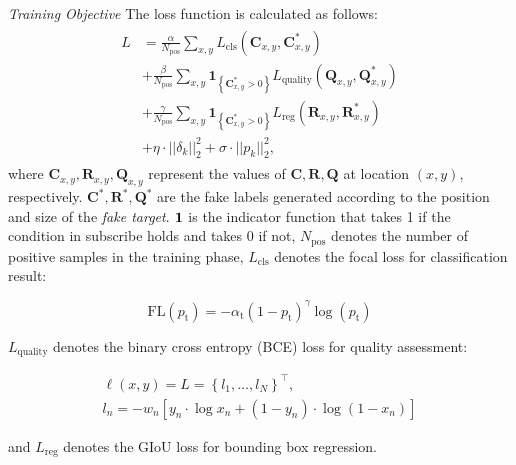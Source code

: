 \documentclass[journal]{IEEEtran}
\begin{document}
\textit{Training Objective} The loss function is calculated as follows:
\begin{equation}
\begin{array}{l}
\begin{aligned}
L&=\frac{\alpha}{N_{\mathrm{pos}}} \sum_{x, y} L_{\mathrm{cls}}\left(\textbf{C}_{x, y}, \textbf{C}_{x, y}^{*}\right) \\
&+\frac{\beta}{N_{\mathrm{pos}}} \sum_{x, y} \textbf{1}_{\left\{\textbf{C}_{x, y}^{*}>0\right\}} L_{\mathrm{quality}}\left(\textbf{Q}_{x, y}, \textbf{Q}_{x, y}^{*}\right) \\
&+\frac{\gamma}{N_{\mathrm{pos}}} \sum_{x, y} \textbf{1}_{\left\{\textbf{C}_{x, y}^{*}>0\right\}} L_{\mathrm{reg}}\left(\textbf{R}_{x, y}, \textbf{R}_{x, y}^{*}\right) \\
&+\eta \cdot ||\delta_k||_2^2 +  \sigma \cdot ||p_k||^2_2,
\end{aligned}
\end{array}
\label{eq:loss}
\end{equation}
where $\textbf{C}_{x, y}, \textbf{R}_{x, y}, \textbf{Q}_{x, y}$ represent the values of $\textbf{C}, \textbf{R}, \textbf{Q}$ at location $(x, y)$, respectively. $\textbf{C}^*, \textbf{R}^*, \textbf{Q}^*$ are the fake labels generated according to the position and size of the \textit{fake target}. $\textbf 1$ is the indicator function that takes 1 if the condition in subscribe holds and takes 0 if not, $N_{\mathrm{pos}}$ denotes the number of positive samples in the training phase, $L_{\mathrm{cls}}$ denotes the focal loss \cite{focal} for classification result:

\begin{equation}
  \mathrm{FL}\left(p_{\mathrm{t}}\right)=-\alpha_{\mathrm{t}}\left(1-p_{\mathrm{t}}\right)^{\gamma} \log \left(p_{\mathrm{t}}\right)
\end{equation}

$L_{\mathrm{quality}}$ denotes the binary cross entropy (BCE) loss for quality assessment:

\begin{equation}
\begin{array}{ll}
\ell(x, y)=L=\left\{l_{1}, \ldots, l_{N}\right\}^{\top},\\
l_{n}=-w_{n}\left[y_{n} \cdot \log x_{n}+\left(1-y_{n}\right) \cdot \log \left(1-x_{n}\right)\right]
\end{array}
\end{equation}

and $L_{\mathrm{reg}}$ denotes the GIoU loss \cite{GIoU} for bounding box regression.
\end{document}
